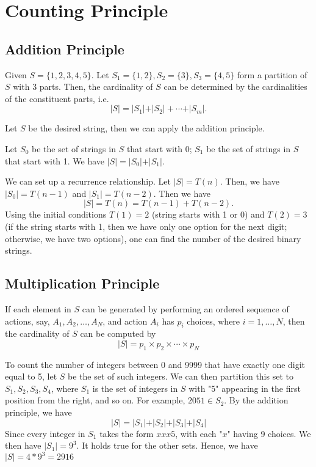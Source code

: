\section{Counting Principle}
\subsection{Addition Principle}
Given \(S = \{1, 2, 3, 4, 5\}\). Let \(S_1 = \{1, 2\}, S_2 = \{3\}, S_3 = \{4, 5\}\) form a partition of \(S\) with 3 parts. Then, the cardinality of \(S\) can be determined by the cardinalities of the constituent parts, i.e. 
\[
    \vert S \vert = \vert S_1 \vert + \vert S_2 \vert + \cdots + \vert S_m \vert. 
\]

\begin{eg}

    Let \(S\) be the desired string, then we can apply the addition principle.

    Let \(S_0\) be the set of strings in \(S\) that start with 0; \(S_1\) be the set of strings in \(S\) that start with 1. We have \(\vert S \vert = \vert S_0 \vert + \vert S_1 \vert\).

    We can set up a recurrence relationship. Let \(\vert S \vert = T(n)\). Then, we have \(\vert S_0 \vert = T(n - 1)\) and \(\vert S_1 \vert = T(n - 2)\). Then we have 
    \[
        \vert S \vert = T(n) = T(n - 1) + T(n - 2). 
    \]
    Using the initial conditions \(T(1) = 2\) (string starts with 1 or 0) and \(T(2) = 3\) (if the string starts with 1, then we have only one option for the next digit; otherwise, we have two options), one can find the number of the desired binary strings. 
\end{eg}

\subsection{Multiplication Principle}
If each element in \(S\) can be generated by performing an ordered sequence of actions, say, \(A_1, A_2, \dots, A_N\), and action \(A_i\) has \(p_i\) choices, where \(i = 1, \dots, N\), then the cardinality of \(S\) can be computed by
\[
    \vert S \vert = p_1 \times p_2 \times \cdots \times p_N
\] 

\begin{eg}
    To count the number of integers between 0 and 9999 that have exactly one digit equal to 5, let \(S\) be the set of such integers. We can then partition this set to \(S_1, S_2, S_3, S_4\),  where \(S_1\) is the set of integers in \(S\) with "5" appearing in the first position from the right, and so on. For example, \(2051 \in S_2\). By the addition principle, we have
    \[
        \vert S \vert = \vert S_1 \vert + \vert S_2 \vert + \vert S_3 \vert + \vert S_4 \vert 
    \]
    Since every integer in \(S_1\) takes the form \(xxx5\), with each "\(x\)" having 9 choices. We then have \(\vert S_1 \vert = 9^3\). It holds true for the other sets. Hence, we have \(\vert S \vert = 4 * 9^3 = 2916\)
\end{eg}


